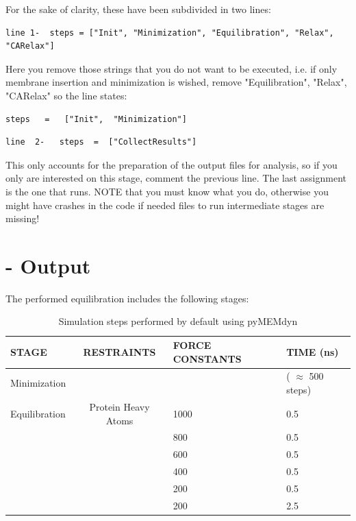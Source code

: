 \documentclass[10pt, oneside, pdftex]{article}
\begin{document}
For the  sake of clarity,  these have been  subdivided in  two lines:  

\begin{Verbatim}
line 1-  steps = ["Init", "Minimization", "Equilibration", "Relax", "CARelax"] 
\end{Verbatim}
Here you remove those strings that you do not want to be executed, i.e. if only
membrane insertion and minimization is wished, remove "Equilibration",
"Relax",   "CARelax"   so   the   line  states:   
\begin{Verbatim}
steps   =   ["Init",  "Minimization"]  
\end{Verbatim}

\begin{Verbatim}
line  2-   steps  =  ["CollectResults"]  
\end{Verbatim}

This  only accounts for the  preparation of the output files  for analysis, so if
you only are interested on  this stage, comment the previous line. The
last assignment  is the one that  runs.  NOTE that you  must know what
you do, otherwise  you might have crashes in the  code if needed files
to  run  intermediate  stages   are  missing!   

\section*{ - Output}  
The  performed equilibration includes the following stages:

\begin{table}[htbp]
\centering
\small\addtolength{\tabcolsep}{-2pt}
\begin{tabular}{p{1.8cm}|c|p{1.9cm}|p{2.0cm}}
\hline
\textbf{STAGE} & \textbf{RESTRAINTS} & \textbf{FORCE CONSTANTS} & \textbf{TIME} (ns)  \\ \hline
Minimization   &	 	   &                 & ( $\approx$ 500 steps)\\ \hline
Equilibration  & Protein Heavy Atoms & 1000	     & 0.5\\
               &  & 800	     & 0.5\\
               &  & 600	     & 0.5\\
               &  & 400	     & 0.5\\
               &  & 200	     & 0.5\\
               &  & 200	     & 2.5\\ \hline
\end{tabular}
\parbox{5.8in}{\caption{\footnotesize{Simulation steps performed by default using pyMEMdyn}}}
\label{tab:equilibration}
\end{table}
\end{document}
